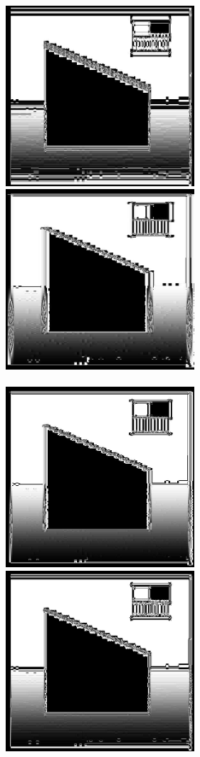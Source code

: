\documentclass[a4paper,12pt,openany]{report}
\begin{document}
\begin{center}
\\
\includegraphics[width=7cm]{resources/modified/sample/sample_sharpen_21x3.jpg}
\includegraphics[width=7cm]{resources/modified/sample/sample_sharpen_3x21.jpg}
\\
\\
\includegraphics[width=7cm]{resources/modified/sample/sample_sharpen_5x11.jpg}
\includegraphics[width=7cm]{resources/modified/sample/sample_sharpen_11x5.jpg}
\end{center}
\end{document}
